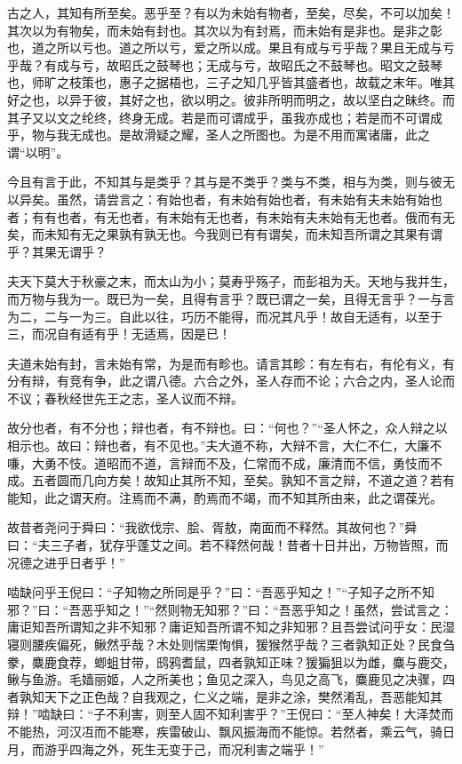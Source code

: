 \documentclass[a4paper,12pt,UTF8,twoside]{ctexbook}
\begin{document}
古之人，其知有所至矣。恶乎至？有以为未始有物者，至矣，尽矣，不可以加矣！其次以为有物矣，而未始有封也。其次以为有封焉，而未始有是非也。是非之彰也，道之所以亏也。道之所以亏，爱之所以成。果且有成与亏乎哉？果且无成与亏乎哉？有成与亏，故昭氏之鼓琴也；无成与亏，故昭氏之不鼓琴也。昭文之鼓琴也，师旷之枝策也，惠子之据梧也，三子之知几乎皆其盛者也，故载之末年。唯其好之也，以异于彼，其好之也，欲以明之。彼非所明而明之，故以坚白之昧终。而其子又以文之纶终，终身无成。若是而可谓成乎，虽我亦成也；若是而不可谓成乎，物与我无成也。是故滑疑之耀，圣人之所图也。为是不用而寓诸庸，此之谓“以明”。

今且有言于此，不知其与是类乎？其与是不类乎？类与不类，相与为类，则与彼无以异矣。虽然，请尝言之：有始也者，有未始有始也者，有未始有夫未始有始也者；有有也者，有无也者，有未始有无也者，有未始有夫未始有无也者。俄而有无矣，而未知有无之果孰有孰无也。今我则已有有谓矣，而未知吾所谓之其果有谓乎？其果无谓乎？

夫天下莫大于秋豪之末，而太山为小；莫寿乎殇子，而彭祖为夭。天地与我并生，而万物与我为一。既已为一矣，且得有言乎？既已谓之一矣，且得无言乎？一与言为二，二与一为三。自此以往，巧历不能得，而况其凡乎！故自无适有，以至于三，而况自有适有乎！无适焉，因是已！

夫道未始有封，言未始有常，为是而有畛也。请言其畛：有左有右，有伦有义，有分有辩，有竞有争，此之谓八德。六合之外，圣人存而不论；六合之内，圣人论而不议；春秋经世先王之志，圣人议而不辩。

故分也者，有不分也；辩也者，有不辩也。曰：“何也？”“圣人怀之，众人辩之以相示也。故曰：辩也者，有不见也。”夫大道不称，大辩不言，大仁不仁，大廉不嗛，大勇不忮。道昭而不道，言辩而不及，仁常而不成，廉清而不信，勇忮而不成。五者圆而几向方矣！故知止其所不知，至矣。孰知不言之辩，不道之道？若有能知，此之谓天府。注焉而不满，酌焉而不竭，而不知其所由来，此之谓葆光。

故昔者尧问于舜曰：“我欲伐宗、脍、胥敖，南面而不释然。其故何也？”舜曰：“夫三子者，犹存乎蓬艾之间。若不释然何哉！昔者十日并出，万物皆照，而况德之进乎日者乎！”

啮缺问乎王倪曰：“子知物之所同是乎？”曰：“吾恶乎知之！”“子知子之所不知邪？”曰：“吾恶乎知之！”“然则物无知邪？”曰：“吾恶乎知之！虽然，尝试言之：庸讵知吾所谓知之非不知邪？庸讵知吾所谓不知之非知邪？且吾尝试问乎女：民湿寝则腰疾偏死，鳅然乎哉？木处则惴栗恂惧，猨猴然乎哉？三者孰知正处？民食刍豢，麋鹿食荐，蝍蛆甘带，鸱鸦耆鼠，四者孰知正味？猨猵狙以为雌，麋与鹿交，鳅与鱼游。毛嫱丽姬，人之所美也；鱼见之深入，鸟见之高飞，麋鹿见之决骤，四者孰知天下之正色哉？自我观之，仁义之端，是非之涂，樊然淆乱，吾恶能知其辩！”啮缺曰：“子不利害，则至人固不知利害乎？”王倪曰：“至人神矣！大泽焚而不能热，河汉冱而不能寒，疾雷破山、飘风振海而不能惊。若然者，乘云气，骑日月，而游乎四海之外，死生无变于己，而况利害之端乎！”
\end{document}
